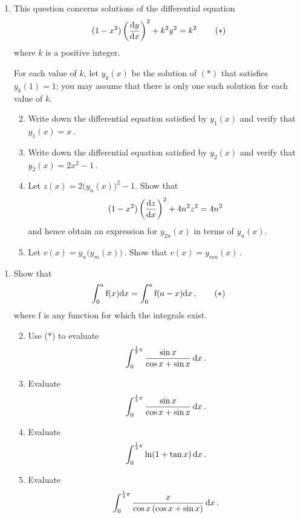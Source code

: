 \documentclass[a4, 11pt]{report}
\newlength{\qspace}
\newcounter{qnumber}
\newenvironment{question}%
 {\vspace{\qspace}
  \begin{enumerate}[\bfseries 1\quad][10]%
    \setcounter{enumi}{\value{qnumber}}%
    \item%
 }
{
  \end{enumerate}
  \filbreak
  \stepcounter{qnumber}
 }
\newenvironment{questionparts}[1][1]%
 {
  \begin{enumerate}[\bfseries (i)]%
    \setcounter{enumii}{#1}
    \addtocounter{enumii}{-1}
    \setlength{\itemsep}{5mm}
    \setlength{\parskip}{8pt}
 }
 {
  \end{enumerate}
 }
\def\d{{\rm d}}
\def\f{{\rm f}}
\begin{document}
\begin{question}
This question concerns solutions of 
 the differential equation
\[
(1-x^2) \left(\frac{\d y}{\d x}\right)^2 + k^2 y^2 = k^2\,
\tag{$*$}
\]
where $k$ is a positive integer. 

For each value of $k$, let $y_k(x)$  be
the solution of $(*)$ that satisfies $y_k(1)=1$; 
you may 
assume that
there is only one such solution for each value of $k$.



\begin{questionparts}
\item
Write down the differential equation satisfied by $y_1(x)$ and
verify that $y_1(x) = x\,$. 
\item 
Write down the differential equation satisfied by $y_2(x)$ and
verify that  $y_2(x) = 2x^2-1\,$.
\item 
Let $z(x) = 2\big(y_n(x)\big)^2 -1$. Show that
\[
 (1-x^2) \left(\frac{\d z}{\d x}\right)^2 +4n^2 z^2 = 4n^2\,
\]
and hence obtain an expression for $y_{2n}(x)$ in terms of $y_n(x)$.
\item 
Let $v(x) = y_n\big(y_m(x)\big)\,$. 
Show that $v(x) = y_{mn}(x)\,$.
\end{questionparts}
\end{question}


\begin{question}
Show that 
\[
\int_0^a \f(x) \d x= \int _0^a \f(a-x) \d x\,,
\tag{$*$}
\]
where f is any function for which the integrals exist.
\begin{questionparts}
\item Use ($*$)  to evaluate
\[
\int_0^{\frac12\pi} \frac{\sin x}{\cos x + \sin x} \, \d x
\,.
\]
\item Evaluate
\[
\int_0^{\frac14\pi} \frac{\sin x}{\cos x + \sin x} \, \d x
\,.
\]
\item Evaluate
\[
\int_0^{\frac14\pi} \ln (1+\tan x) \, \d x
\,.
\]
\item Evaluate
\[
\int_0^{\frac14 \pi}
 \frac x {\cos x \, (\cos x + \sin x)}\, \d x
\,.
\]
\end{questionparts}

\end{question} 
\end{document}
